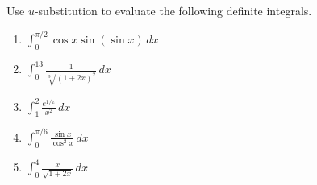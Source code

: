 \begin{Exercise}[title = {Definite Integrals and u-substitution}, label = u_def]
Use $u$-substitution to evaluate the following definite integrals. 
\begin{enumerate}
\item $\int_0^{\pi / 2} \cos{x} \sin{ \left( \sin{ x } \right) }\,dx$
\item $\int_0^{13} \frac{1}{\sqrt[3]{\left( 1 + 2x \right)^2}}\,dx$
\item $\int_1^2 \frac{e^{1/x}}{x^2}\,dx$
\item $\int_0^{\pi / 6} \frac{\sin{x}}{\cos^2{x}}\,dx$
\item $\int_0^4 \frac{x}{\sqrt{1 + 2x}}\,dx$
\end{enumerate}
\end{Exercise}

